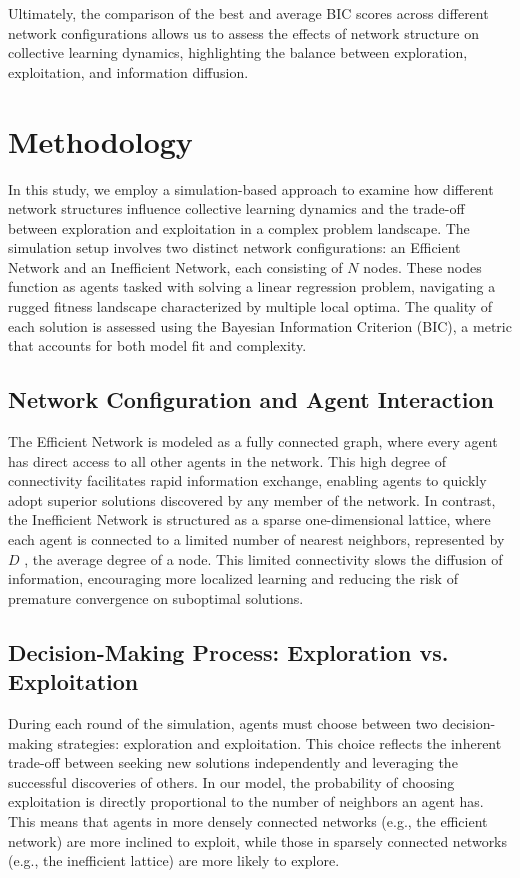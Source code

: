 \documentclass[conference]{IEEEtran}
\begin{document}
Ultimately, the comparison of the best and average BIC scores across different network configurations allows us to assess the effects of network structure on collective learning dynamics, highlighting the balance between exploration, exploitation, and information diffusion.

\section{Methodology}

In this study, we employ a simulation-based approach to examine how different network structures influence collective learning dynamics and the trade-off between exploration and exploitation in a complex problem landscape. The simulation setup involves two distinct network configurations: an Efficient Network and an Inefficient Network, each consisting of $N$ nodes. These nodes function as agents tasked with solving a linear regression problem, navigating a rugged fitness landscape characterized by multiple local optima. The quality of each solution is assessed using the Bayesian Information Criterion (BIC), a metric that accounts for both model fit and complexity.

\subsection{Network Configuration and Agent Interaction}
The Efficient Network is modeled as a fully connected graph, where every agent has direct access to all other agents in the network. This high degree of connectivity facilitates rapid information exchange, enabling agents to quickly adopt superior solutions discovered by any member of the network. In contrast, the Inefficient Network is structured as a sparse one-dimensional lattice, where each agent is connected to a limited number of nearest neighbors, represented by $D$ , the average degree of a node. This limited connectivity slows the diffusion of information, encouraging more localized learning and reducing the risk of premature convergence on suboptimal solutions.

\subsection{Decision-Making Process: Exploration vs. Exploitation}
During each round of the simulation, agents must choose between two decision-making strategies: exploration and exploitation. This choice reflects the inherent trade-off between seeking new solutions independently and leveraging the successful discoveries of others. In our model, the probability of choosing exploitation is directly proportional to the number of neighbors an agent has. This means that agents in more densely connected networks (e.g., the efficient network) are more inclined to exploit, while those in sparsely connected networks (e.g., the inefficient lattice) are more likely to explore.
\end{document}
